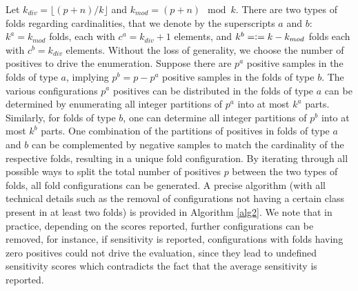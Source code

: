 \documentclass[3p, times]{elsarticle}
\newcommand{\defeq}{\vcentcolon=}
\begin{document}
Let $k_{div} = \lfloor (p + n) / k \rfloor$ and $k_{mod} = (p + n) \mod k$. There are two types of folds regarding cardinalities, that we denote by the superscripts $a$ and $b$: $k^a = k_{mod}$ folds, each with $c^{a} = k_{div} + 1$ elements, and $k^b = \defeq k - k_{mod}$ folds each with $c^b = k_{div}$ elements. Without the loss of generality, we choose the number of positives to drive the enumeration. Suppose there are $p^a$ positive samples in the folds of type $a$, implying $p^b = p - p^a$ positive samples in the folds of type $b$. The various configurations $p^a$ positives can be distributed in the folds of type $a$ can be determined by enumerating all integer partitions of $p^a$ into at most $k^a$ parts. Similarly, for folds of type $b$, one can determine all integer partitions of $p^b$ into at most $k^b$ parts. One combination of the partitions of positives in folds of type $a$ and $b$ can be complemented by negative samples to match the cardinality of the respective folds, resulting in a unique fold configuration. By iterating through all possible ways to split the total number of positives $p$ between the two types of folds, all fold configurations can be generated. A precise algorithm (with all technical details such as the removal of configurations not having a certain class present in at least two folds) is provided in Algorithm \ref{alg2}. We note that in practice, depending on the scores reported, further configurations can be removed, for instance, if sensitivity is reported, configurations with folds having zero positives could not drive the evaluation, since they lead to undefined sensitivity scores which contradicts the fact that the average sensitivity is reported.
\end{document}
